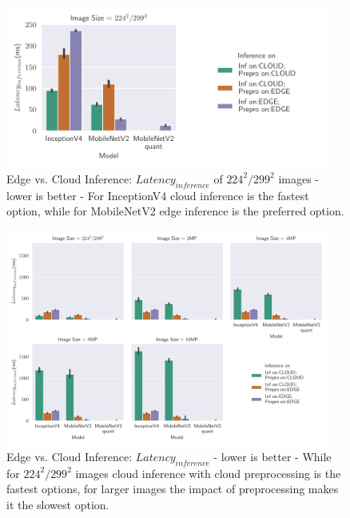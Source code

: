 \begin{figure}[!htb]
\centering
\includegraphics[width=0.95\textwidth]{./Bilder/single_plots/edge_vs_cloud_plots/Edge_vs_Cloud_Inference_Inference_Latencies_onlyNR.pdf}
\caption[Edge vs. Cloud Inference:  $Latency_{inference}$ of $224^2/299^2$ images - lower is better]{Edge vs. Cloud Inference:  $Latency_{inference}$ of $224^2/299^2$ images - lower is better - For InceptionV4 cloud inference is the fastest option, while for MobileNetV2 edge inference is the preferred option.}
\label{fig:EdgeVsCloudInferenceLatNR}
\end{figure}
\begin{figure}[!htb]
\centering
\includegraphics[width=0.95\textwidth]{./Bilder/single_plots/edge_vs_cloud_plots/Edge_vs_Cloud_Inference_Inference_Latencies.pdf}
\caption[Edge vs. Cloud Inference:  $Latency_{inference}$ - lower is better]{Edge vs. Cloud Inference:  $Latency_{inference}$ - lower is better -
While for $224^2/299^2$ images cloud inference with cloud preprocessing is the fastest options, for larger images the impact of preprocessing makes it the slowest option.}
\label{fig:EdgeVsCloudInferenceLat}
\end{figure}

